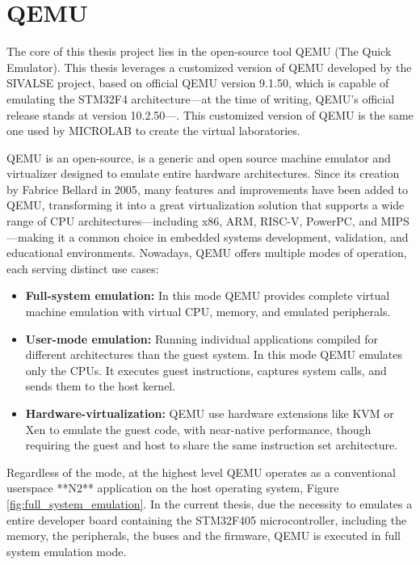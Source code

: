 \chapter{QEMU}
\label{chap:QEMU_Arch}

The core of this thesis project lies in the open-source tool QEMU (The Quick Emulator). 
This thesis leverages a customized version of QEMU developed by the 
SIVALSE project, based on official QEMU version 9.1.50, which is capable of 
emulating the STM32F4 architecture—at the time of writing, QEMU's official release 
stands at version 10.2.50—. This customized version of QEMU is the same one used 
by MICROLAB to create the virtual laboratories.

QEMU is an open-source, is a generic and open source machine emulator and 
virtualizer designed to emulate entire hardware architectures\cite{QemuProject}. Since its 
creation by Fabrice Bellard in 2005\cite{WikiFabriceBellard}, many features and improvements have been 
added to QEMU, transforming it into a great virtualization solution that supports 
a wide range of CPU architectures—including x86, ARM, RISC-V, PowerPC, and 
MIPS—making it a common choice in embedded systems development, validation, 
and educational environments. Nowadays, QEMU offers multiple modes of 
operation, each serving distinct use cases:

\begin{itemize}
    \item \textbf{Full-system emulation:    }In this mode QEMU provides complete virtual machine emulation with virtual CPU, memory, and emulated peripherals.
    \item \textbf{User-mode emulation:      }Running individual applications compiled for different architectures than the guest system. In this mode QEMU emulates only the CPUs. It executes guest instructions, captures system calls, and sends them to the host kernel. 
    \item \textbf{Hardware-virtualization:  }QEMU use hardware extensions like KVM or Xen to emulate the guest code, with near-native performance, though requiring the guest and host to share the same instruction set architecture.
\end{itemize}

Regardless of the mode, at the highest level QEMU operates as a conventional 
userspace **N2** application on the host operating system, Figure \ref{fig:full_system_emulation}. In the 
current thesis, due the necessity to emulates a entire developer board containing the 
STM32F405 microcontroller, including the memory, the peripherals, the buses and the firmware, 
QEMU is executed in full system emulation mode.

